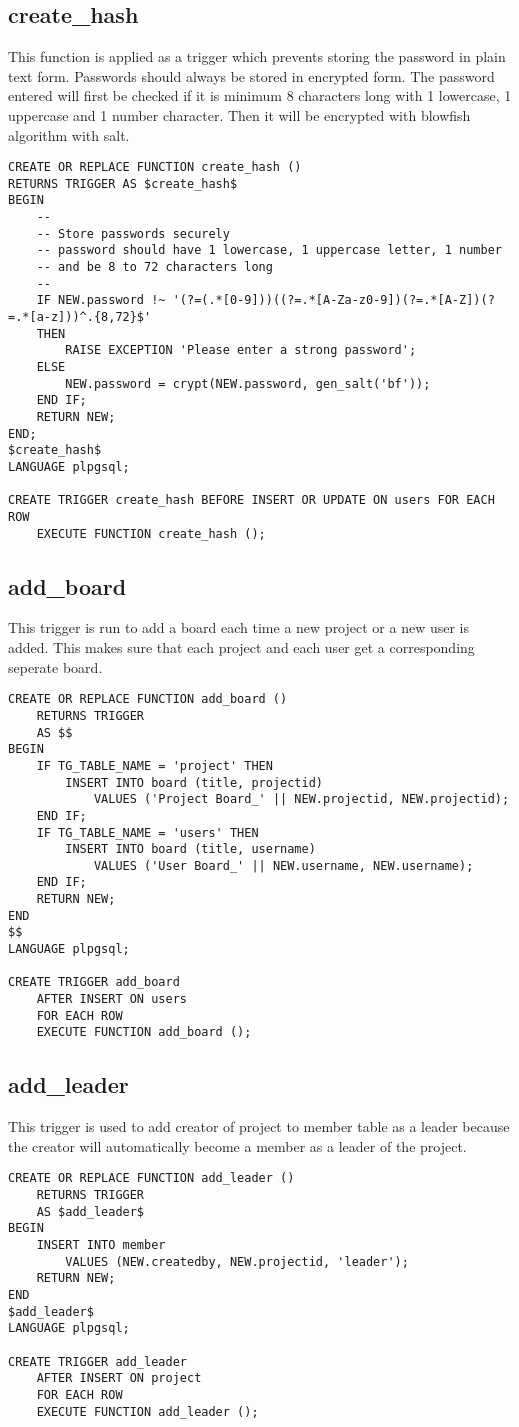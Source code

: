 \documentclass[conference,onecolumn]{IEEEtran}
\begin{document}
\subsection{\textbf{create\_hash}}
This function is applied as a trigger which prevents storing the password in plain text form.
Passwords should always be stored in encrypted form. The password entered will first be checked
if it is minimum 8 characters long with 1 lowercase, 1 uppercase and 1 number character.
Then it will be encrypted with blowfish algorithm with salt.
\begin{verbatim}
CREATE OR REPLACE FUNCTION create_hash ()
RETURNS TRIGGER AS $create_hash$
BEGIN
    --
    -- Store passwords securely
    -- password should have 1 lowercase, 1 uppercase letter, 1 number
    -- and be 8 to 72 characters long
    --
    IF NEW.password !~ '(?=(.*[0-9]))((?=.*[A-Za-z0-9])(?=.*[A-Z])(?=.*[a-z]))^.{8,72}$'
    THEN
        RAISE EXCEPTION 'Please enter a strong password';
    ELSE
        NEW.password = crypt(NEW.password, gen_salt('bf'));
    END IF;
    RETURN NEW;
END;
$create_hash$
LANGUAGE plpgsql;

CREATE TRIGGER create_hash BEFORE INSERT OR UPDATE ON users FOR EACH ROW
    EXECUTE FUNCTION create_hash ();
\end{verbatim}

\subsection{\textbf{add\_board}}
This trigger is run to add a board each time a new project or a new user is added.
This makes sure that each project and each user get a corresponding seperate board.
\begin{verbatim}
CREATE OR REPLACE FUNCTION add_board ()
    RETURNS TRIGGER
    AS $$
BEGIN
    IF TG_TABLE_NAME = 'project' THEN
        INSERT INTO board (title, projectid)
            VALUES ('Project Board_' || NEW.projectid, NEW.projectid);
    END IF;
    IF TG_TABLE_NAME = 'users' THEN
        INSERT INTO board (title, username)
            VALUES ('User Board_' || NEW.username, NEW.username);
    END IF;
    RETURN NEW;
END
$$
LANGUAGE plpgsql;

CREATE TRIGGER add_board
    AFTER INSERT ON users
    FOR EACH ROW
    EXECUTE FUNCTION add_board ();
\end{verbatim}

\subsection{\textbf{add\_leader}}
This trigger is used to add creator of project to member table as a leader because the creator will automatically become a member as a leader of the project.
\begin{verbatim}
CREATE OR REPLACE FUNCTION add_leader ()
    RETURNS TRIGGER
    AS $add_leader$
BEGIN
    INSERT INTO member
        VALUES (NEW.createdby, NEW.projectid, 'leader');
    RETURN NEW;
END
$add_leader$
LANGUAGE plpgsql;

CREATE TRIGGER add_leader
    AFTER INSERT ON project
    FOR EACH ROW
    EXECUTE FUNCTION add_leader ();
\end{verbatim}
\end{document}
